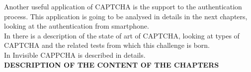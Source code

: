 Another useful application of CAPTCHA is the support to the authentication process. This application is going to be analysed in details in the next chapters, looking at the authentication from smartphone.\\
In  there is a description of the state of art of CAPTCHA, looking at types of CAPTCHA and the related tests from which this challenge is born.\\
In  Invisible CAPPCHA is described in details.\\
\textbf{DESCRIPTION OF THE CONTENT OF THE CHAPTERS}